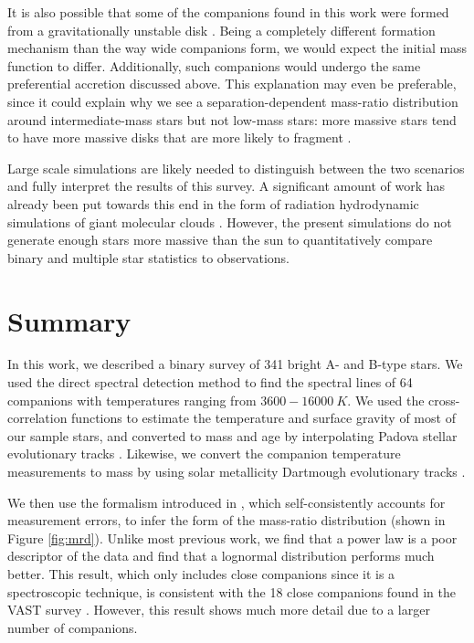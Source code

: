 \documentclass{emulateapj}
\begin{document}
It is also possible that some of the companions found in this work were formed from a gravitationally unstable disk \citep[e.g.][]{Kratter2006, Stamatellos2011}. Being a completely different formation mechanism than the way wide companions form, we would expect the initial mass function to differ. Additionally, such companions would undergo the same preferential accretion discussed above. This explanation may even be preferable, since it could explain why we see a separation-dependent mass-ratio distribution around intermediate-mass stars but not low-mass stars: more massive stars tend to have more massive disks \citep{Andrews2013} that are more likely to fragment \citep{Kratter2010}.

Large scale simulations are likely needed to distinguish between the two scenarios and fully interpret the results of this survey. A significant amount of work has already been put towards this end in the form of radiation hydrodynamic simulations of giant molecular clouds \citep{Bate2012, Krumholz2012}. However, the present simulations do not generate enough stars more massive than the sun to quantitatively compare binary and multiple star statistics to observations. 


\section{Summary}

In this work, we described a binary survey of 341 bright A- and B-type stars. We used the direct spectral detection method \citep{Gullikson2016} to find the spectral lines of 64 companions with temperatures ranging from $3600 - 16000\ K$.  We used the cross-correlation functions to estimate the temperature and surface gravity of most of our sample stars, and converted to mass and age by interpolating Padova stellar evolutionary tracks \citep{Bressan2012}. Likewise, we convert the companion temperature measurements to mass by using solar metallicity Dartmough evolutionary tracks \citep{Dotter2008}. 

We then use the formalism introduced in \citet{Foreman2014}, which self-consistently accounts for measurement errors, to infer the form of the mass-ratio distribution (shown in Figure \ref{fig:mrd}). Unlike most previous work, we find that a power law is a poor descriptor of the data and find that a lognormal distribution performs much better. This result, which only includes close companions since it is a spectroscopic technique, is consistent with the 18 close companions found in the VAST survey \citep{DeRosa2014}. However, this result shows much more detail due to a larger number of companions. 
\end{document}

